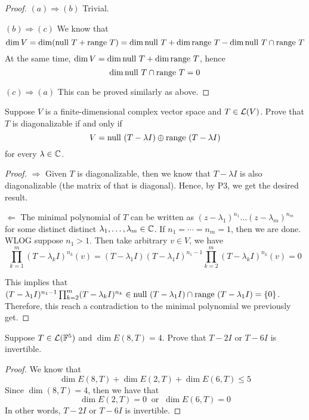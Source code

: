 \documentclass{extarticle}
\begin{document}
\begin{proof}
\((a) \Rightarrow (b)\) Trivial. 

\((b) \Rightarrow (c)\) We know that 
\[\dim V = \dim (\text{null } T  + \text{range } T) = \dim \text{null } T + \dim \text{range } T - \dim \text{null } T \cap \text{range } T\]
At the same time, \(\dim V = \dim \text{null } T + \dim \text{range } T\), hence 
\[\dim \text{null } T \cap \text{range } T = 0\]

\((c) \Rightarrow (a)\) This can be proved similarly as above. 
\end{proof}

\begin{problem}{5}
    Suppose \(V\) is a finite-dimensional complex vector space and \(T \in \mathcal{L}(V)\). Prove that 
    \(T\) is diagonalizable if and only if 
    \[V= \text{null } (T - \lambda I) \oplus \text{range } (T - \lambda I)\]
    for every \(\lambda \in \mathbb{C}\).
\end{problem}

\begin{proof}
\(\Rightarrow\) Given \(T\) is diagonalizable, then we know that \(T - \lambda I\) is also 
diagonalizable (the matrix of that is diagonal). Hence, by P3, we get the desired result. 

\(\Leftarrow\) The minimal polynomial of \(T\) can be written as 
\((z - \lambda_1)^{n_1}\ldots(z - \lambda_m)^{n_m}\) for some distinct distinct \(\lambda_1, \ldots, 
\lambda_m \in \mathbb{C}\). If \(n_1 = \cdots = n_m = 1\), then we are done. WLOG suppose \(n_1 > 1\). Then take 
arbitrary \(v \in V\), we have 
\[\prod_{k=1}^m (T - \lambda_k I)^{n_k} (v) = (T - \lambda_1 I)(T - \lambda_1 I)^{n_1 - 1} 
\prod_{k=2}^m (T - \lambda_k I)^{n_k}(v) = 0\]

This implies that \((T - \lambda_1 I)^{n_1 - 1} \prod_{k=2}^m (T - \lambda_k I)^{n_k} \in \text{null } (T - \lambda_1 I) 
\cap \text{range } (T - \lambda_1 I) = \{0\}\). Therefore, this reach a contradiction to the minimal polynomial we 
previously get.
\end{proof}

\begin{problem}{6}
    Suppose \(T \in \mathcal{L}(\mathbb{F}^5)\) and \(\dim E(8, T) = 4\). Prove that \(T - 2 I\) or \(T - 6I\) is invertible. 
\end{problem}

\begin{proof}
We know that 
\[\dim E(8, T) + \dim E(2, T) + \dim E(6, T) \leq 5\]
Since \(\dim (8, T) = 4\), then we have that 
\[\dim E(2,T) = 0 \ \text{ or } \ \dim E(6, T) = 0\]
In other words, \(T - 2I\) or \(T - 6I\) is invertible. 
\end{proof}
\end{document}
